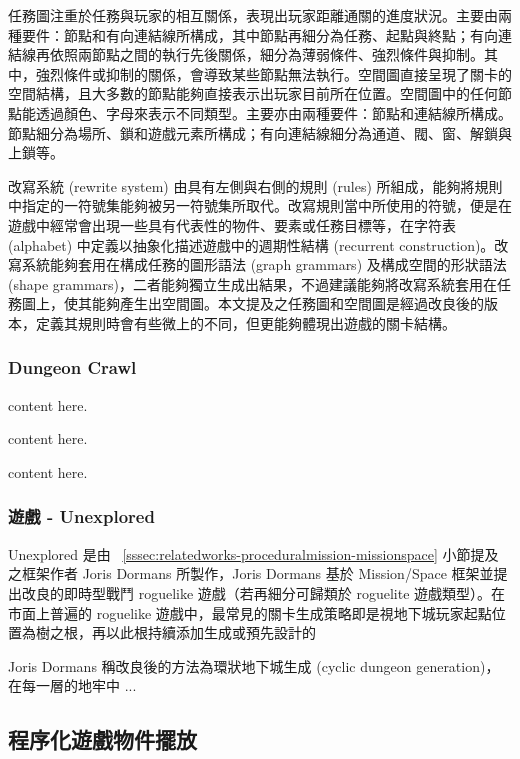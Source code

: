 任務圖注重於任務與玩家的相互關係，表現出玩家距離通關的進度狀況。主要由兩種要件：節點和有向連結線所構成，其中節點再細分為任務、起點與終點；有向連結線再依照兩節點之間的執行先後關係，細分為薄弱條件、強烈條件與抑制。其中，強烈條件或抑制的關係，會導致某些節點無法執行。空間圖直接呈現了關卡的空間結構，且大多數的節點能夠直接表示出玩家目前所在位置。空間圖中的任何節點能透過顏色、字母來表示不同類型。主要亦由兩種要件：節點和連結線所構成。節點細分為場所、鎖和遊戲元素所構成；有向連結線細分為通道、閥、窗、解鎖與上鎖等。

改寫系統 (rewrite system) 由具有左側與右側的規則 (rules) 所組成，能夠將規則中指定的一符號集能夠被另一符號集所取代。改寫規則當中所使用的符號，便是在遊戲中經常會出現一些具有代表性的物件、要素或任務目標等，在字符表 (alphabet) 中定義以抽象化描述遊戲中的週期性結構 (recurrent construction)。改寫系統能夠套用在構成任務的圖形語法 (graph grammars) 及構成空間的形狀語法 (shape grammars)，二者能夠獨立生成出結果，不過建議能夠將改寫系統套用在任務圖上，使其能夠產生出空間圖。本文提及之任務圖和空間圖是經過改良後的版本，定義其規則時會有些微上的不同，但更能夠體現出遊戲的關卡結構。

\subsubsection{Dungeon Crawl}
\label{sssec:relatedworks-proceduralmission-dungeoncrawl}

content here.

content here.

content here.

\subsubsection{遊戲 - Unexplored}
\label{sssec:relatedworks-proceduralmission-unexplored}

Unexplored 是由 ~\ref{sssec:relatedworks-proceduralmission-missionspace} 小節提及之框架作者 Joris Dormans 所製作，Joris Dormans 基於 Mission/Space 框架並提出改良的即時型戰鬥 roguelike 遊戲（若再細分可歸類於 roguelite 遊戲類型）。在市面上普遍的 roguelike 遊戲中，最常見的關卡生成策略即是視地下城玩家起點位置為樹之根，再以此根持續添加生成或預先設計的

Joris Dormans 稱改良後的方法為環狀地下城生成 (cyclic dungeon generation)，在每一層的地牢中 ...

\subsection{程序化遊戲物件擺放}
\label{ssec:relatedworks-proceduralgamepatterns}

